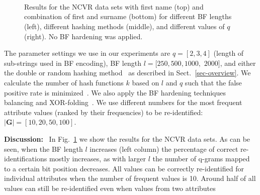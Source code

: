 \documentclass{llncs}
\begin{document}
\begin{figure}[!t]
  \centering
  ~~
  ~~
  \\ ~ \\
  ~~
  ~~
\caption{Results for the NCVR data sets with first name (top)
    and combination of first and surname (bottom) for different BF
    lengths (left), different hashing methods (middle), and different
    values of $q$ (right). No BF hardening was applied.
   \label{fig:ncvr}}
\end{figure}


The parameter settings we use in our experiments are $q = [2,3,4]$
(length of sub-strings used in BF encoding), BF length
$l = [250, 500, 1000,$ $2000]$, and either the double or random
hashing method~\cite{Sch16} as described in
Sect.~\ref{sec-overview}. We calculate the number of hash functions
$k$ based on $l$ and $q$ such that the false positive rate is
minimized~\cite{Vat14c}. We also apply the BF hardening techniques
balancing and XOR-folding~\cite{Sch16}.
We use different numbers for the most frequent attribute values
(ranked by their frequencies) to be re-identified: $|\mathbf{G}| =
[10,20,50,100]$.


\textbf{Discussion:}~
In Fig.~\ref{fig:ncvr} we show the results for the NCVR data sets.
%
As can be seen, when the BF length $l$ increases (left column) the
percentage of correct re-identifications mostly increases, as with
larger $l$ the number of q-grams mapped to a certain bit position
decreases. All values can be correctly re-identified for individual
attributes
when the number of frequent values is 10.
Around half of all
values can still be re-identified even when values from two
attributes
\end{document}
